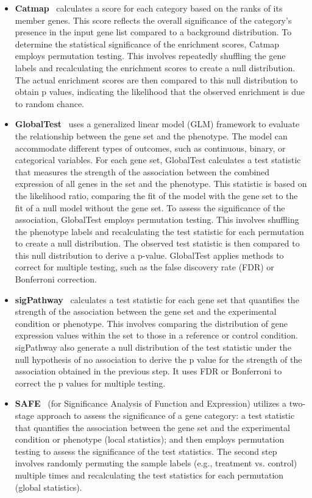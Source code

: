 \documentclass[Minh_PhD_thesis.tex]{subfiles}
\begin{document}
\begin{itemize}
\item \textbf{Catmap}~\cite{Breslin:2004} calculates a score for each category based on the ranks of its member genes. This score reflects the overall significance of the category's presence in the input gene list compared to a background distribution. To determine the statistical significance of the enrichment scores, Catmap employs permutation testing. This involves repeatedly shuffling the gene labels and recalculating the enrichment scores to create a null distribution. The actual enrichment scores are then compared to this null distribution to obtain p values, indicating the likelihood that the observed enrichment is due to random chance.

\item \textbf{GlobalTest}~\cite{Goeman:2004} uses a generalized linear model (GLM) framework to evaluate the relationship between the gene set and the phenotype. The model can accommodate different types of outcomes, such as continuous, binary, or categorical variables. For each gene set, GlobalTest calculates a test statistic that measures the strength of the association between the combined expression of all genes in the set and the phenotype. This statistic is based on the likelihood ratio, comparing the fit of the model with the gene set to the fit of a null model without the gene set. To assess the significance of the association, GlobalTest employs permutation testing. This involves shuffling the phenotype labels and recalculating the test statistic for each permutation to create a null distribution. The observed test statistic is then compared to this null distribution to derive a p-value. GlobalTest applies methods to correct for multiple testing, such as the false discovery rate (FDR) or Bonferroni correction.

\item \textbf{sigPathway}~\cite{Tian:2005} calculates a test statistic for each gene set that quantifies the strength of the association between the gene set and the experimental condition or phenotype. This involves comparing the distribution of gene expression values within the set to those in a reference or control condition. sigPathway also generate a null distribution of the test statistic under the null hypothesis of no association to derive the p value for the strength of the association obtained in the previous step. It uses FDR or Bonferroni to correct the p values for multiple testing.

\item \textbf{SAFE}~\cite{Barry:2005} (for Significance Analysis of Function and Expression)  utilizes a two-stage approach to assess the significance of a gene category: a test statistic that quantifies the association between the gene set and the experimental condition or phenotype (local statistics); and then employs permutation testing to assess the significance of the test statistics. The second step involves randomly permuting the sample labels (e.g., treatment vs. control) multiple times and recalculating the test statistics for each permutation (global statistics).


\end{itemize}
\end{document}
